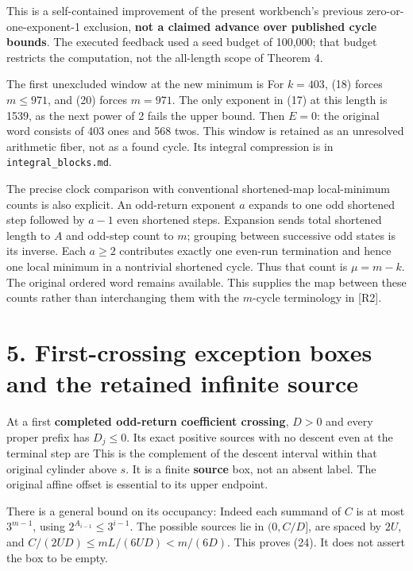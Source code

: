 This is a self-contained improvement of the present workbench's previous
zero-or-one-exponent-1 exclusion, \textbf{not a claimed advance over
published cycle bounds}. The executed feedback used a seed budget of
100,000; that budget restricts the computation, not the all-length scope
of Theorem 4.

The first unexcluded window at the new minimum is
 For \(k=403\), (18) forces \(m\le971\),
and (20) forces \(m=971\). The only exponent in (17) at this length is
1539, as the next power of 2 fails the upper bound. Then \(E=0\): the
original word consists of 403 ones and 568 twos. This window is retained
as an unresolved arithmetic fiber, not as a found cycle. Its integral
compression is in \nolinkurl{integral_blocks.md}.

The precise clock comparison with conventional shortened-map
local-minimum counts is also explicit. An odd-return exponent \(a\)
expands to one odd shortened step followed by \(a-1\) even shortened
steps. Expansion sends total shortened length to \(A\) and odd-step
count to \(m\); grouping between successive odd states is its inverse.
Each \(a\ge2\) contributes exactly one even-run termination and hence
one local minimum in a nontrivial shortened cycle. Thus that count is
\(\mu=m-k\). The original ordered word remains available. This supplies
the map between these counts rather than interchanging them with the
\(m\)-cycle terminology in {[}R2{]}.

\section{5. First-crossing exception boxes and the retained infinite
source}

At a first \textbf{completed odd-return coefficient crossing}, \(D>0\)
and every proper prefix has \(D_j\le0\). Its exact positive sources with
no descent even at the terminal step are  This is the
complement of the descent interval within that original cylinder above
\(s\). It is a finite \textbf{source} box, not an absent label. The
original affine offset is essential to its upper endpoint.

There is a general bound on its occupancy:
Indeed each summand of \(C\) is at most \(3^{m-1}\), using
\(2^{A_{i-1}}\le3^{i-1}\). The possible sources lie in \((0,C/D]\), are
spaced by \(2U\), and \(C/(2UD)\le mL/(6UD)<m/(6D)\). This proves (24).
It does not assert the box to be empty.

